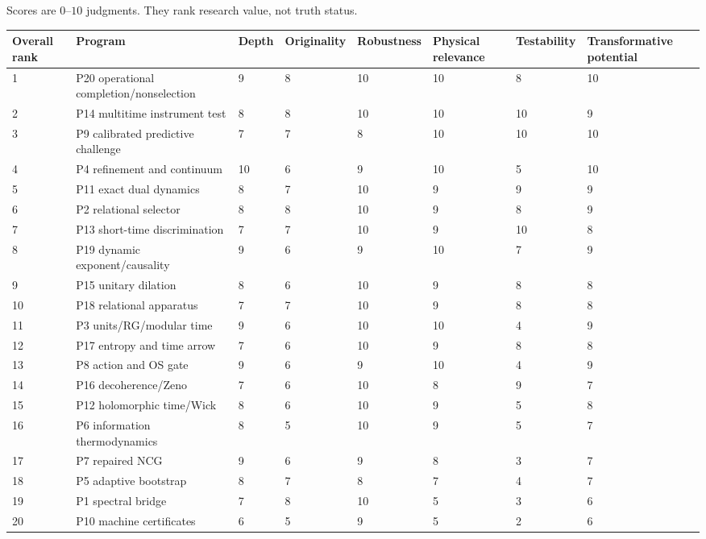 \documentclass[11pt,a4paper,openany]{report}
\begin{document}
Scores are \(0\)–\(10\) judgments. They rank research value, not truth status.

\begin{center}
\begingroup\fontsize{6.5}{7.8}\selectfont
\setlength{\tabcolsep}{3.5pt}
\renewcommand{\arraystretch}{1.16}
\begin{longtable}{@{}p{}p{}p{}p{}p{}p{}p{}p{}@{}}
\toprule
\textbf{Overall rank} & \textbf{Program} & \textbf{Depth} & \textbf{Originality} & \textbf{Robustness} & \textbf{Physical relevance} & \textbf{Testability} & \textbf{Transformative potential} \\
\midrule
\endhead
1 & P20 operational completion/\allowbreak{}nonselection & 9 & 8 & 10 & 10 & 8 & 10 \\
2 & P14 multitime instrument test & 8 & 8 & 10 & 10 & 10 & 9 \\
3 & P9 calibrated predictive challenge & 7 & 7 & 8 & 10 & 10 & 10 \\
4 & P4 refinement and continuum & 10 & 6 & 9 & 10 & 5 & 10 \\
5 & P11 exact dual dynamics & 8 & 7 & 10 & 9 & 9 & 9 \\
6 & P2 relational selector & 8 & 8 & 10 & 9 & 8 & 9 \\
7 & P13 short-time discrimination & 7 & 7 & 10 & 9 & 10 & 8 \\
8 & P19 dynamic exponent/\allowbreak{}causality & 9 & 6 & 9 & 10 & 7 & 9 \\
9 & P15 unitary dilation & 8 & 6 & 10 & 9 & 8 & 8 \\
10 & P18 relational apparatus & 7 & 7 & 10 & 9 & 8 & 8 \\
11 & P3 units/\allowbreak{}RG/\allowbreak{}modular time & 9 & 6 & 10 & 10 & 4 & 9 \\
12 & P17 entropy and time arrow & 7 & 6 & 10 & 9 & 8 & 8 \\
13 & P8 action and OS gate & 9 & 6 & 9 & 10 & 4 & 9 \\
14 & P16 decoherence/\allowbreak{}Zeno & 7 & 6 & 10 & 8 & 9 & 7 \\
15 & P12 holomorphic time/\allowbreak{}Wick & 8 & 6 & 10 & 9 & 5 & 8 \\
16 & P6 information thermodynamics & 8 & 5 & 10 & 9 & 5 & 7 \\
17 & P7 repaired NCG & 9 & 6 & 9 & 8 & 3 & 7 \\
18 & P5 adaptive bootstrap & 8 & 7 & 8 & 7 & 4 & 7 \\
19 & P1 spectral bridge & 7 & 8 & 10 & 5 & 3 & 6 \\
20 & P10 machine certificates & 6 & 5 & 9 & 5 & 2 & 6 \\
\bottomrule
\end{longtable}
\endgroup
\end{center}
\end{document}

